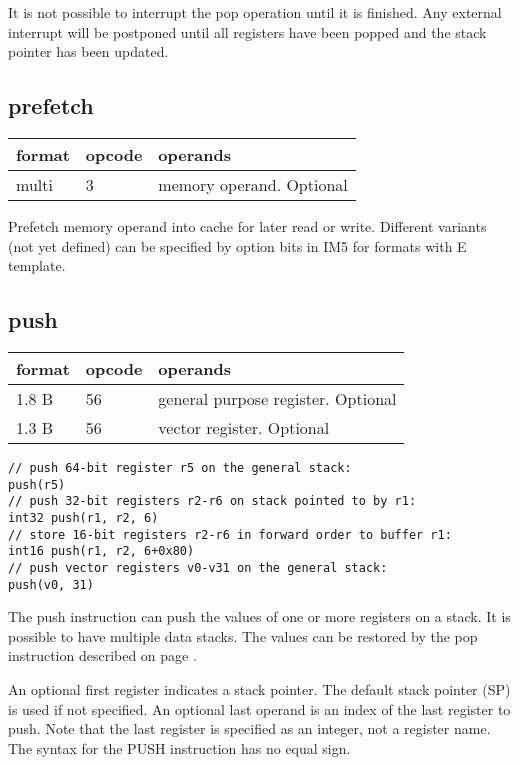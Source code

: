 \documentclass[forwardcom.tex]{subfiles}
\begin{document}
It is not possible to interrupt the pop operation until it is finished. Any external interrupt will be postponed until all registers have been popped and the stack pointer has been updated.
\vv


\subsection{prefetch}
\label{table:prefetchInstruction}
\begin{tabular}{|p{12mm}|p{15mm}|p{100mm}|}
\hline
\bfseries format & \bfseries opcode & \bfseries operands \\ \hline
multi & 3 & memory operand. Optional \\ \hline
\end{tabular}
\vv

Prefetch memory operand into cache for later read or write.
Different variants (not yet defined) can be specified by option bits in IM5 for formats with E template.
\vv


\subsection{push}
\label{table:pushInstruction}
\begin{tabular}{|p{12mm}|p{15mm}|p{100mm}|}
\hline
\bfseries format & \bfseries opcode & \bfseries operands \\ \hline
1.8 B & 56 & general purpose register. Optional \\ 
1.3 B & 56 & vector register. Optional \\ \hline
\end{tabular}
\vv

\begin{lstlisting}[frame=none]
// push 64-bit register r5 on the general stack:
push(r5)
// push 32-bit registers r2-r6 on stack pointed to by r1:
int32 push(r1, r2, 6)
// store 16-bit registers r2-r6 in forward order to buffer r1:
int16 push(r1, r2, 6+0x80)
// push vector registers v0-v31 on the general stack:
push(v0, 31)
\end{lstlisting}
\vv

The push instruction can push the values of one or more registers on a stack. It is possible to have multiple data stacks. 
The values can be restored by the pop instruction described on page \pageref{table:popInstruction}.
\vv

An optional first register indicates a stack pointer. The default stack pointer (SP) is used if not specified. An optional last operand is an index of the last register to push. Note that the last register is specified as an integer, not a register name. The syntax for the PUSH instruction has no equal sign.
\vv
\end{document}
